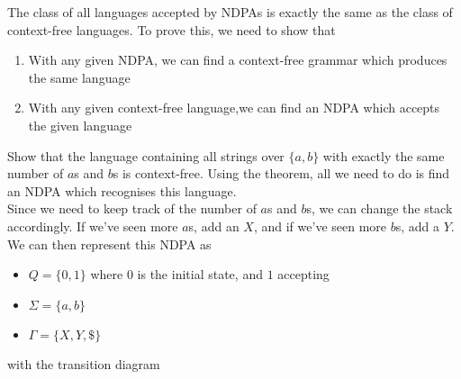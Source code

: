 The class of all languages accepted by NDPAs is exactly the same as the class of context-free languages. To prove this,
 we need to show that
\begin{enumerate}
  \item With any given NDPA, we can find a context-free grammar which produces the same language
  \item With any given context-free language,we can find an NDPA which accepts the given language
\end{enumerate}

\begin{example*}{}{}
  Show that the language containing all strings over $\{a, b\}$ with exactly the same number of $a$s and $b$s is
   context-free. Using the theorem, all we need to do is find an NDPA which recognises this language.\\
  
  Since we need to keep track of the number of $a$s and $b$s, we can change the stack accordingly. If we've seen more
   $a$s, add an $X$, and if we've seen more $b$s, add a $Y$.\\

  We can then represent this NDPA as
  \begin{itemize}
    \item $Q = \{0, 1\}$ where $0$ is the initial state, and $1$ accepting
    \item $\Sigma = \{a, b\}$
    \item $\Gamma = \{X, Y, \$\}$
  \end{itemize}
  with the transition diagram
  \begin{center}
  \end{center}
\end{example*}

